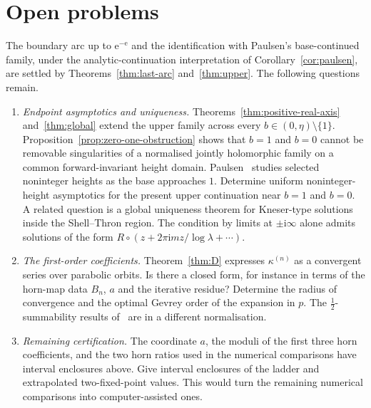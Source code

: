 \documentclass[11pt]{amsart}
\theoremstyle{definition}
\newcommand{\Rr}{R}
\newcommand{\eee}{\mathrm{e}}
\newcommand{\ii}{\mathrm{i}}
\begin{document}
\section{Open problems}\label{sec:open}

The boundary arc up to $\eee^{-\eee}$ and the identification with Paulsen's
base-continued family, under the analytic-continuation interpretation of
Corollary~\ref{cor:paulsen}, are settled by
Theorems~\ref{thm:last-arc} and~\ref{thm:upper}.  The following questions remain.

\begin{enumerate}
\item \emph{Endpoint asymptotics and uniqueness.}
  Theorems~\ref{thm:positive-real-axis} and~\ref{thm:global} extend the
  upper family across every $b\in(0,\eta)\setminus\{1\}$.
  Proposition~\ref{prop:zero-one-obstruction} shows that $b=1$ and $b=0$
  cannot be removable singularities of a normalised jointly holomorphic
  family on a common forward-invariant height domain.
  Paulsen~\cite{Paulsen2026} studies selected noninteger heights as the base
  approaches $1$.  Determine uniform noninteger-height asymptotics for the
  present upper continuation near $b=1$ and $b=0$.  A related question is a
  global uniqueness theorem for Kneser-type solutions inside the Shell--Thron
  region.  The condition by limits at $\pm\ii\infty$ alone admits solutions of the form
  $\Rr\circ(z+2\pi\ii mz/\log\lambda+\cdots)$.
\item \emph{The first-order coefficients.}  Theorem~\ref{thm:D} expresses
  $\kappa^{(n)}$ as a convergent series over parabolic orbits.  Is there a closed
  form, for instance in terms of the horn-map data $B_n$, $a$ and the iterative
  residue?  Determine the radius of convergence and the optimal Gevrey
  order of the expansion in $p$.  The $\tfrac12$-summability results
  of~\cite{ChristopherRousseau,Ribon2010} are in a different normalisation.
\item \emph{Remaining certification.}  The coordinate $a$, the moduli
  of the first three horn coefficients, and the two horn ratios used in the
  numerical comparisons have interval enclosures above.  Give interval enclosures
  of the ladder and extrapolated two-fixed-point values.  This would turn
  the remaining numerical comparisons into computer-assisted ones.
\end{enumerate}
\end{document}
